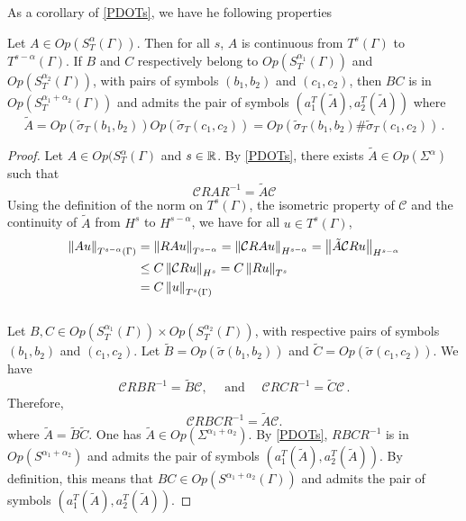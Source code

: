 \documentclass[a4paper]{article}
\begin{document}
\noindent As a corollary of \autoref{PDOTs}, we have he following properties
\begin{Cor}
	\label{CorContinuitePDOTs}
	Let $A \in \textit{Op}(S^\alpha_T(\Gamma))$. Then for all $s$, $A$ is continuous from $T^s(\Gamma)$ to $T^{s - \alpha}(\Gamma)$. If $B$ and $C$ respectively belong to $\textit{Op}(S^{\alpha_1}_T(\Gamma))$ and $\textit{Op}(S^{\alpha_2}_T(\Gamma))$, with pairs of symbols $(b_1,b_2)$ and $(c_1,c_2)$, then $BC$ is in $\textit{Op}(S^{\alpha_1 + \alpha_2}_T(\Gamma))$ and admits the pair of symbols $(a_1^T(\tilde{A}),a_2^T(\tilde{A}))$ where
	\[\tilde{A} = \textit{Op}(\tilde{\sigma}_T(b_1,b_2)) \textit{Op}(\tilde{\sigma}_T(c_1,c_2)) = \textit{Op}(\tilde{\sigma}_T(b_1,b_2)\#\tilde{\sigma}_T(c_1,c_2))\,.\]
\end{Cor}
\begin{proof}
	Let $A \in \textit{Op}(S^\alpha_T(\Gamma)$ and $s \in \mathbb{R}$. By \autoref{PDOTs}, there exists $\tilde{A} \in \textit{Op}(\Sigma^\alpha)$ such that 
	\[\mathcal{C}RAR^{-1} = \tilde{A}\mathcal{C}\]
	Using the definition of the norm on $T^s(\Gamma)$, the isometric property of $\mathcal{C}$ and the continuity of $\tilde{A}$ from $H^s$ to $H^{s - \alpha}$, we have for all $u \in T^s(\Gamma)$,  
	\[\begin{split}
	\left\|Au\right\|_{T^{s-\alpha}(\Gamma)} &= \left\|RA u\right\|_{T^{s-\alpha}}
	=\left\|\mathcal{C}RA u\right\|_{H^{s-\alpha}}
	=\left\|\tilde{A}\mathcal{C}Ru\right\|_{H^{s-\alpha}}\\
	&\leq C \left\|\mathcal{C}Ru\right\|_{H^s} = C\left\|Ru\right\|_{T^s}\\
	& = C\left\|u\right\|_{T^s(\Gamma)}
	\end{split}\]
	\\
	Let $B,C \in \textit{Op}(S^{\alpha_1}_T(\Gamma))\times\textit{Op}(S^{\alpha_2}_T(\Gamma))$, with respective pairs of symbols $(b_1,b_2)$ and $(c_1,c_2)$. Let $\tilde{B} = \textit{Op}(\tilde{\sigma}{(b_1,b_2)})$ and $\tilde{C} = \textit{Op}(\tilde{\sigma}{(c_1,c_2)})$. We have 
	\[\mathcal{C} RBR^{-1} = \tilde{B} \mathcal{C}, \quad \text{ and } \quad  \mathcal{C} RCR^{-1} = \tilde{C} \mathcal{C}\,.\]
	Therefore, 
	\[\mathcal{C} RBCR^{-1} = \tilde{A} \mathcal{C}.\]
	where $\tilde{A} = \tilde{B}\tilde{C}$. One has $\tilde{A} \in \textit{Op}(\Sigma^{\alpha_1 + \alpha_2})$. By \autoref{PDOTs}, $RBCR^{-1}$ is in $\textit{Op}(S^{\alpha_1 + \alpha_2})$ and admits the pair of symbols $(a_1^T(\tilde{A}),a_2^T(\tilde{A}))$. By definition, this means that $BC \in \textit{Op}(S^{\alpha_1 + \alpha_2}(\Gamma))$ and admits the pair of symbols $(a_1^T(\tilde{A}),a_2^T(\tilde{A}))$. 
\end{proof}
\end{document}
